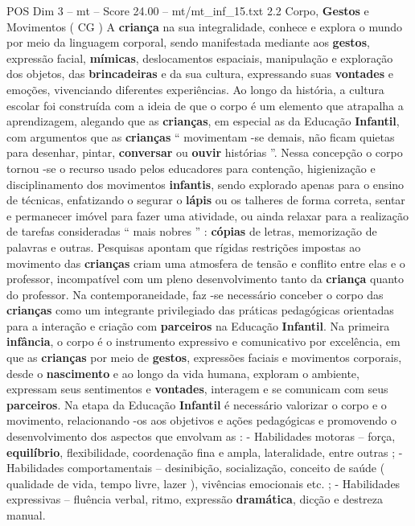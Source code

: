 \begin{textsample}{POS Dim 3 – mt – Score 24.00 – mt/mt\_inf\_15.txt}  \label{ex:f3_pos_078}
2.2 Corpo, \textbf{Gestos} e Movimentos ( CG ) A \textbf{criança} na sua integralidade, conhece e explora o mundo por meio da linguagem corporal, sendo manifestada mediante aos \textbf{gestos}, expressão facial, \textbf{mímicas}, deslocamentos espaciais, manipulação e exploração dos objetos, das \textbf{brincadeiras} e da sua cultura, expressando suas \textbf{vontades} e emoções, vivenciando diferentes experiências.
Ao longo da história, a cultura escolar foi construída com a ideia de que o corpo é um elemento que atrapalha a aprendizagem, alegando que as \textbf{crianças}, em especial as da Educação \textbf{Infantil}, com argumentos que as \textbf{crianças} “ movimentam -se demais, não ficam quietas para desenhar, pintar, \textbf{conversar} ou \textbf{ouvir} histórias ”.
Nessa concepção o corpo tornou -se o recurso usado pelos educadores para contenção, higienização e disciplinamento dos movimentos \textbf{infantis}, sendo explorado apenas para o ensino de técnicas, enfatizando o segurar o \textbf{lápis} ou os talheres de forma correta, sentar e permanecer imóvel para fazer uma atividade, ou ainda relaxar para a realização de tarefas consideradas “ mais nobres ” : \textbf{cópias} de letras, memorização de palavras e outras.
Pesquisas apontam que rígidas restrições impostas ao movimento das \textbf{crianças} criam uma atmosfera de tensão e conflito entre elas e o professor, incompatível com um pleno desenvolvimento tanto da \textbf{criança} quanto do professor.
Na contemporaneidade, faz -se necessário conceber o corpo das \textbf{crianças} como um integrante privilegiado das práticas pedagógicas orientadas para a interação e criação com \textbf{parceiros} na Educação \textbf{Infantil}.
Na primeira \textbf{infância}, o corpo é o instrumento expressivo e comunicativo por excelência, em que as \textbf{crianças} por meio de \textbf{gestos}, expressões faciais e movimentos corporais, desde o \textbf{nascimento} e ao longo da vida humana, exploram o ambiente, expressam seus sentimentos e \textbf{vontades}, interagem e se comunicam com seus \textbf{parceiros}.
Na etapa da Educação \textbf{Infantil} é necessário valorizar o corpo e o movimento, relacionando -os aos objetivos e ações pedagógicas e promovendo o desenvolvimento dos aspectos que envolvam as : - Habilidades motoras – força, \textbf{equilíbrio}, flexibilidade, coordenação fina e ampla, lateralidade, entre outras ; - Habilidades comportamentais – desinibição, socialização, conceito de saúde ( qualidade de vida, tempo livre, lazer ), vivências emocionais etc. ; - Habilidades expressivas – fluência verbal, ritmo, expressão \textbf{dramática}, dicção e destreza manual.

\end{textsample}
